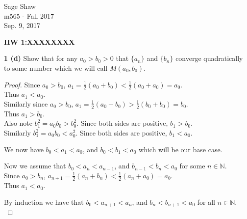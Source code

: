 \documentclass[12pt]{article}
\begin{document}
	\thispagestyle{empty}
	
	\begin{flushright}
		Sage Shaw \\
		m565 - Fall 2017 \\
		Sep. 9, 2017
	\end{flushright}
	
	{\large \textbf{HW 1:XXXXXXXX}}\bigbreak

	\hspace{-4 ex}\textbf{1 (d) } Show that for any $a_{0} > b_{0} > 0$ that $\{a_{n}\}$ and $\{b_{n}\}$ converge quadratically to
	some number which we will call $M(a_{0}, b_{0})$. \\
	
	\begin{proof}
		Since $a_{0} > b_{0}$, $a_{1} = \frac{1}{2} (a_{0}+b_{0}) < \frac{1}{2} (a_{0}+a_{0}) = a_{0}$. \\
		Thus $a_{1} < a_{0}$. \\
		Similarly since $a_{0} > b_{0}$, $a_{1} = \frac{1}{2} (a_{0}+b_{0}) > \frac{1}{2} (b_{0}+b_{0}) = b_{0}$. \\
		Thus $a_{1} > b_{0}$. \\
		Also note $b_{1}^{2} = a_{0}b_{0} > b_{0}^{2}$. Since both sides are positive, $b_{1} > b_{0}$. \\
		Similarly $b_{1}^{2} = a_{0}b_{0} < a_{0}^{2}$. Since both sides are positive, $b_{1} < a_{0}$. \bigbreak
		
		We now have $b_{0}<a_{1} < a_{0}$, and $b_{0}<b_{1} < a_{0}$ which will be our base case. \bigbreak
		
		Now we assume that $b_{0}<a_{n} < a_{n-1}$, and $b_{n-1}<b_{n}< a_{0}$ for some $n \in \mathbb{N}$.\\
		Since $a_{0} > b_{n}$, $a_{n+1} = \frac{1}{2} (a_{n}+b_{n}) < \frac{1}{2} (a_{n}+a_{0}) = a_{0}$. \\
		Thus $a_{1} < a_{0}$. \\
		
		\bigbreak
		
		By induction we have that $b_{0}<a_{n+1} < a_{n}$, and $b_{n}<b_{n+1}< a_{0}$ for all $n \in \mathbb{N}$. \\
		 
	\end{proof}
\end{document}
